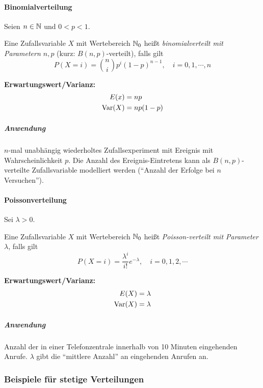 				\paragraph{Binomialverteilung}
					Seien \( n \in \mathbb{N} \) und \( 0 < p < 1 \).

					Eine Zufallsvariable \(X\) mit Wertebereich \( \mathbb{N}_0 \) heißt \textit{binomialverteilt mit Parametern \( n, p \)} (kurz: \( B(n, p) \)-verteilt), falls gilt
					\begin{equation*}
						P(X = i) = { n \choose i } p^i (1 - p)^{ n - 1 }, \quad i = 0, 1, \cdots, n
					\end{equation*}

					\textbf{Erwartungswert/Varianz:}
					\begin{align*}
						E(x)    & = np      \\
						\operatorname{Var}(X) & = np(1-p)
					\end{align*}

					\subparagraph{Anwendung}
						\(n\)-mal unabhängig wiederholtes Zufallsexperiment mit Ereignis mit Wahrscheinlichkeit \(p\). Die Anzahl des Ereignis-Eintretens kann als \( B(n, p) \)-verteilte Zufallsvariable modelliert werden (\enquote{Anzahl der Erfolge bei \(n\) Versuchen}).

				\paragraph{Poissonverteilung}
					Sei \( \lambda > 0 \).

					Eine Zufallsvariable \(X\) mit Wertebereich \( \mathbb{N}_0 \) heißt \textit{Poisson-verteilt mit Parameter \( \lambda \)}, falls gilt
					\begin{equation*}
						P(X = i) = \frac{\lambda^i}{i!} e^{-\lambda}, \quad i = 0, 1, 2, \cdots
					\end{equation*}

					\textbf{Erwartungswert/Varianz:}
					\begin{align*}
						E(X)    & = \lambda \\
						\operatorname{Var}(X) & = \lambda
					\end{align*}

					\subparagraph{Anwendung}
						Anzahl der in einer Telefonzentrale innerhalb von 10 Minuten eingehenden Anrufe. \(\lambda\) gibt die \enquote{mittlere Anzahl} an eingehenden Anrufen an.

			\subsubsection{Beispiele für stetige Verteilungen}

